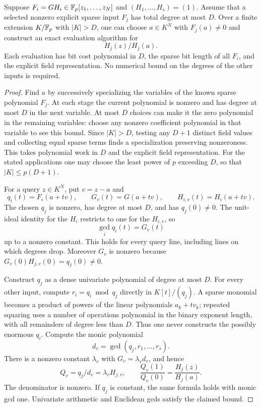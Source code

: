 \begin{lemma}
\label{sp:lem:line-gcd}
Suppose $F_i=G H_i\in\mathbb F_p[z_1,\ldots,z_N]$ and
$(H_1,\ldots,H_s)=(1)$. Assume that a selected nonzero explicit sparse input
$F_j$ has total degree at most $D$. Over a finite extension $K/\mathbb F_p$
with $|K|>D$, one can choose $a\in K^N$ with $F_j(a)\ne0$ and
construct an exact evaluation algorithm for
\[
 H_j(z)/H_j(a).
\]
Each evaluation has bit cost polynomial in $D$, the sparse bit length
of all $F_i$, and the explicit field representation. No numerical bound
on the degrees of the other inputs is required.
\end{lemma}
\begin{proof}
Find $a$ by successively specializing the variables of the known sparse
polynomial $F_j$. At each stage the current polynomial is nonzero and
has degree at most $D$ in the next variable. At most $D$ choices can
make it the zero polynomial in the remaining variables: choose any
nonzero coefficient polynomial in that variable to see this bound.
Since $|K|>D$, testing any $D+1$ distinct field values and collecting
equal sparse terms finds a specialization preserving nonzeroness.
This takes polynomial work in $D$ and the explicit field representation.
For the stated applications one may choose the least power of $p$
exceeding $D$, so that $|K|\leq p(D+1)$.

For a query $z\in K^N$, put $v=z-a$ and
\[
 q_i(t)=F_i(a+tv),\qquad G_v(t)=G(a+tv),\qquad
 H_{i,v}(t)=H_i(a+tv).
\]
The chosen $q_j$ is nonzero, has degree at most $D$, and has
$q_j(0)\ne0$. The unit-ideal identity for the $H_i$ restricts to one
for the $H_{i,v}$, so
\[
 \gcd_i q_i(t)=G_v(t)
\]
up to a nonzero constant. This holds for every query line, including
lines on which degrees drop. Moreover $G_v$ is nonzero because
$G_v(0)H_{j,v}(0)=q_j(0)\ne0$.

Construct $q_j$ as a dense univariate polynomial of degree at most
$D$. For every other input, compute $r_i=q_i\bmod q_j$ directly in
$K[t]/(q_j)$. A sparse monomial becomes a product of powers of the
linear polynomials $a_k+t v_k$; repeated squaring uses a number of
operations polynomial in the binary exponent length, with all
remainders of degree less than $D$. Thus one never constructs the
possibly enormous $q_i$. Compute the monic polynomial
\[
 d_v=\gcd(q_j,r_1,\ldots,r_s).
\]
There is a nonzero constant $\lambda_v$ with
$G_v=\lambda_v d_v$, and hence
\[
 Q_v=q_j/d_v=\lambda_v H_{j,v},\qquad
 \frac{Q_v(1)}{Q_v(0)}=\frac{H_j(z)}{H_j(a)}.
\]
The denominator is nonzero. If $q_j$ is constant, the same formula
holds with monic gcd one. Univariate arithmetic and Euclidean gcds
satisfy the claimed bound.
\end{proof}

